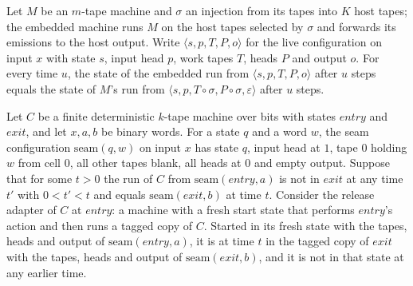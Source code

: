 \begin{theorem}
\label{Turing.NTimeDiag.qy_embed_state}
\leanok
{}
Let $M$ be an $m$-tape machine and $\sigma$ an injection from its tapes into $K$ host tapes; the
embedded machine runs $M$ on the host tapes selected by $\sigma$ and forwards its emissions to
the host output. Write $\langle s, p, T, P, o\rangle$ for the live configuration on input $x$ with
state $s$, input head $p$, work tapes $T$, heads $P$ and output $o$. For every time $u$, the state
of the embedded run from $\langle s, p, T, P, o\rangle$ after $u$ steps equals the state of $M$'s
run from $\langle s, p, T \circ \sigma, P \circ \sigma, \varepsilon\rangle$ after $u$ steps.
\end{theorem}

\begin{theorem}
\label{Turing.NTimeDiag.qy_call}
\leanok
{}
Let $C$ be a finite deterministic $k$-tape machine over bits with states $\mathit{entry}$ and
$\mathit{exit}$, and let $x, a, b$ be binary words. For a state $q$ and a word $w$, the seam
configuration $\mathrm{seam}(q, w)$ on input $x$ has state $q$, input head at $1$, tape $0$
holding $w$ from cell $0$, all other tapes blank, all heads at $0$ and empty output. Suppose that
for some $t > 0$ the run of $C$ from $\mathrm{seam}(\mathit{entry}, a)$ is not in $\mathit{exit}$
at any time $t'$ with $0 < t' < t$ and equals $\mathrm{seam}(\mathit{exit}, b)$ at time $t$.
Consider the release adapter of $C$ at $\mathit{entry}$: a machine with a fresh start state that
performs $\mathit{entry}$'s action and then runs a tagged copy of $C$. Started in its fresh state
with the tapes, heads and output of $\mathrm{seam}(\mathit{entry}, a)$, it is at time $t$ in the
tagged copy of $\mathit{exit}$ with the tapes, heads and output of $\mathrm{seam}(\mathit{exit}, b)$,
and it is not in that state at any earlier time.
\end{theorem}

